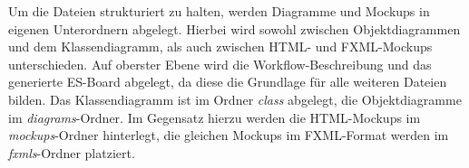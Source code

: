 Um die Dateien strukturiert zu halten, werden Diagramme und Mockups in eigenen Unterordnern abgelegt.
Hierbei wird sowohl zwischen Objektdiagrammen und dem Klassendiagramm, als auch zwischen HTML- und FXML-Mockups unterschieden.
Auf oberster Ebene wird die Workflow-Beschreibung und das generierte \ac{ES}-Board abgelegt, da diese
die Grundlage für alle weiteren Dateien bilden.
Das Klassendiagramm ist im Ordner \textit{class} abgelegt, die Objektdiagramme im \textit{diagrams}-Ordner.
Im Gegensatz hierzu werden die HTML-Mockups im \textit{mockups}-Ordner hinterlegt, die gleichen Mockups im FXML-Format werden
im \textit{fxmls}-Ordner platziert.
